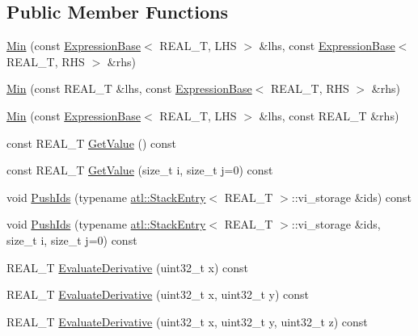 \subsection*{Public Member Functions}
\begin{DoxyCompactItemize}
\item 
\hyperlink{structatl_1_1_min_ae1506e0989fba81a72845b2a87b948e1}{Min} (const \hyperlink{structatl_1_1_expression_base}{Expression\+Base}$<$ R\+E\+A\+L\+\_\+\+T, L\+H\+S $>$ \&lhs, const \hyperlink{structatl_1_1_expression_base}{Expression\+Base}$<$ R\+E\+A\+L\+\_\+\+T, R\+H\+S $>$ \&rhs)
\item 
\hyperlink{structatl_1_1_min_a906c567db23fd85ab69db559b63d86bc}{Min} (const R\+E\+A\+L\+\_\+\+T \&lhs, const \hyperlink{structatl_1_1_expression_base}{Expression\+Base}$<$ R\+E\+A\+L\+\_\+\+T, R\+H\+S $>$ \&rhs)
\item 
\hyperlink{structatl_1_1_min_ae2df8f5bb8b5cb4116d76f974d45c3b6}{Min} (const \hyperlink{structatl_1_1_expression_base}{Expression\+Base}$<$ R\+E\+A\+L\+\_\+\+T, L\+H\+S $>$ \&lhs, const R\+E\+A\+L\+\_\+\+T \&rhs)
\item 
const R\+E\+A\+L\+\_\+\+T \hyperlink{structatl_1_1_min_a28d3a51d455abad2ffcea957716193e4}{Get\+Value} () const 
\item 
const R\+E\+A\+L\+\_\+\+T \hyperlink{structatl_1_1_min_a90253b7bb0f9f6a6d98691297a459cba}{Get\+Value} (size\+\_\+t i, size\+\_\+t j=0) const 
\item 
void \hyperlink{structatl_1_1_min_a23e492722024fbbc49f9fe84f1028e90}{Push\+Ids} (typename \hyperlink{structatl_1_1_stack_entry}{atl\+::\+Stack\+Entry}$<$ R\+E\+A\+L\+\_\+\+T $>$\+::vi\+\_\+storage \&ids) const 
\item 
void \hyperlink{structatl_1_1_min_ace51856580ba941315279aef2ca70144}{Push\+Ids} (typename \hyperlink{structatl_1_1_stack_entry}{atl\+::\+Stack\+Entry}$<$ R\+E\+A\+L\+\_\+\+T $>$\+::vi\+\_\+storage \&ids, size\+\_\+t i, size\+\_\+t j=0) const 
\item 
R\+E\+A\+L\+\_\+\+T \hyperlink{structatl_1_1_min_aab9c8e3526585deef7fc2f91fa63fc92}{Evaluate\+Derivative} (uint32\+\_\+t x) const 
\item 
R\+E\+A\+L\+\_\+\+T \hyperlink{structatl_1_1_min_ada9c68d539700921a25f2a9753c6b5a5}{Evaluate\+Derivative} (uint32\+\_\+t x, uint32\+\_\+t y) const 
\item 
R\+E\+A\+L\+\_\+\+T \hyperlink{structatl_1_1_min_af0f047d817b4c3845302960cf982e7cd}{Evaluate\+Derivative} (uint32\+\_\+t x, uint32\+\_\+t y, uint32\+\_\+t z) const 
\item 

\end{DoxyCompactItemize}

